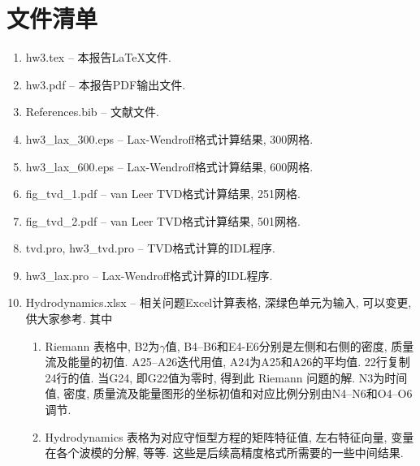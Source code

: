 \documentclass[10.5pt
]{article}
\begin{document}
\section*{文件清单}
\begin{enumerate}
\item
hw3.tex -- 本报告\LaTeX 文件.
\item
hw3.pdf -- 本报告PDF输出文件.
\item
References.bib -- 文献文件.
\item
hw3\_lax\_300.eps -- Lax-Wendroff格式计算结果, 300网格.
\item
hw3\_lax\_600.eps -- Lax-Wendroff格式计算结果, 600网格.
\item
fig\_tvd\_1.pdf -- van Leer TVD格式计算结果, 251网格.
\item
fig\_tvd\_2.pdf -- van Leer TVD格式计算结果, 501网格.
\item 
tvd.pro, hw3\_tvd.pro -- TVD格式计算的IDL程序.
\item 
hw3\_lax.pro -- Lax-Wendroff格式计算的IDL程序.
\item
Hydrodynamics.xlsx -- 相关问题Excel计算表格, 深绿色单元为输入, 可以变更, 供大家参考. 其中
\begin{enumerate}
\item
Riemann 表格中, B2为$\gamma$值, B4--B6和E4-E6分别是左侧和右侧的密度, 质量流及能量的初值. A25--A26迭代用值, A24为A25和A26的平均值. 22行复制24行的值. 当G24, 即G22值为零时, 得到此 Riemann 问题的解. N3为时间值, 密度, 质量流及能量图形的坐标初值和对应比例分别由N4--N6和O4--O6调节.
\item
Hydrodynamics 表格为对应守恒型方程的矩阵特征值, 左右特征向量, 变量在各个波模的分解, 等等. 这些是后续高精度格式所需要的一些中间结果.
\end{enumerate}
\end{enumerate}



\end{document}
